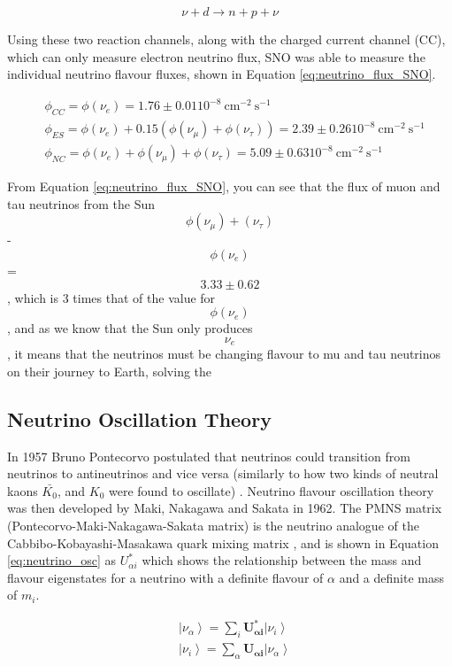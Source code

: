 \begin{equation}
    \nu + d \rightarrow n + p + \nu
\label{eq:neutral_current_SNO}
\end{equation}

Using these two reaction channels, along with the charged current channel (CC), which can only measure electron neutrino flux, SNO was able to measure the individual neutrino flavour fluxes, shown in Equation \ref{eq:neutrino_flux_SNO}. 

$$
\begin{aligned}
&\phi_{C C}=\phi\left(\nu_{e}\right)=1.76 \pm 0.01 10^{-8} \mathrm{~cm}^{-2} \mathrm{~s}^{-1}\\
&\phi_{E S}=\phi\left(\nu_{e}\right)+0.15\left(\phi\left(\nu_{\mu}\right)+\phi\left(\nu_{\tau}\right)\right)=2.39 \pm 0.26 10^{-8} \mathrm{~cm}^{-2} \mathrm{~s}^{-1}\\
&\phi_{N C}=\phi\left(\nu_{e}\right)+\phi\left(\nu_{\mu}\right)+\phi\left(\nu_{\tau}\right) = 5.09 \pm 0.63 10^{-8} \mathrm{~cm}^{-2} \mathrm{~s}^{-1}
\end{aligned}
\label{eq:neutrino_flux_SNO}
$$

From Equation \ref{eq:neutrino_flux_SNO}, you can see that the flux of muon and tau neutrinos from the Sun $$\phi(\nu_{\mu}) + (\nu_{\tau})$$ - $$\phi(\nu_{e})$$ = $$3.33 \pm 0.62$$ , which is 3 times that of the value for $$\phi(\nu_{e})$$, and as we know that the Sun only produces $$\nu_{e}$$, it means that the neutrinos must be changing flavour to mu and tau neutrinos on their journey to Earth, solving the 


\subsection{Neutrino Oscillation Theory}
In 1957 Bruno Pontecorvo postulated that neutrinos could transition from neutrinos to antineutrinos and vice versa (similarly to how two kinds of neutral kaons $\bar{K_{0}}$, and $K_{0}$ were found to oscillate) \cite{Pontecorvo:1957cp}. Neutrino flavour oscillation theory was then developed by Maki, Nakagawa and Sakata in 1962. The PMNS matrix (Pontecorvo-Maki-Nakagawa-Sakata matrix) is the neutrino analogue of the Cabbibo-Kobayashi-Masakawa quark mixing matrix \cite{maki_pmns}, and is shown in Equation \ref{eq:neutrino_osc} as $U_{\alpha i}^{*}$ which shows the relationship between the mass and flavour eigenstates for a neutrino with a definite flavour of $\alpha$ and a definite mass of $m_{i}$.

$$
\begin{aligned}
&\left|\nu_{\alpha}\right\rangle=\sum_{i} \boldsymbol{U_{\alpha i}^{*}}\left|\nu_{i}\right\rangle \\
&\left|\nu_{i}\right\rangle=\sum_{\alpha} \boldsymbol{U_{\alpha i}}\left|\nu_{\alpha}\right\rangle
\end{aligned}
\label{eq:neutrino_osc}
$$


